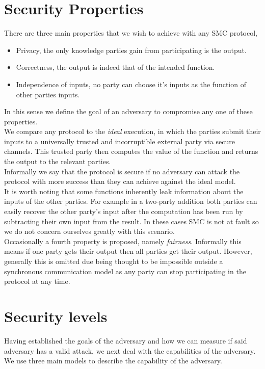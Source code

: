 \documentclass[ %
                    author={Nicholas Tutte},
                supervisor={Prof. Nigel Smart},
                    degree={MEng},
                     title={Secure Two Party Computation},
                  subtitle={A practical comparison of recent protocols},
                      type={Research - GG1K},
                      year={2015} ]{dissertation}
\begin{document}
		\section{Security Properties} \label{sub:SecurityProperties}
			There are three main properties that we wish to achieve with any SMC protocol,
			\begin{itemize}
				\item Privacy, the only knowledge parties gain from participating is the output.
				\item Correctness, the output is indeed that of the intended function.
				\item Independence of inputs, no party can choose it's inputs as the function of other parties inputs.
			\end{itemize}

			In this sense we define the goal of an adversary to compromise any one of these properties.\\

			We compare any protocol to the \emph{ideal} execution, in which the parties submit their inputs to a universally trusted and incorruptible external party via secure channels. This trusted party then computes the value of the function and returns the output to the relevant parties.\\

			Informally we say that the protocol is secure if no adversary can attack the protocol with more success than they can achieve against the ideal model.\\

			It is worth noting that some functions inherently leak information about the inputs of the other parties. For example in a two-party addition both parties can easily recover the other party's input after the computation has been run by subtracting their own input from the result. In these cases SMC is not at fault so we do not concern ourselves greatly with this scenario.\\

			Occasionally a fourth property is proposed, namely \emph{fairness}. Informally this means if one party gets their output then all parties get their output. However, generally this is omitted due being thought to be impossible outside a synchronous communication model as any party can stop participating in the protocol at any time.

		\section{Security levels}\label{sub:SecurityLevels}
			Having established the goals of the adversary and how we can measure if said adversary has a valid attack, we next deal with the capabilities of the adversary. We use three main models to describe the capability of the adversary.
\end{document}
